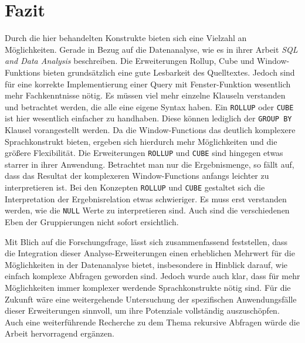 \chapter{Fazit}
\label{chap:fazit} Durch die hier behandelten Konstrukte bieten sich eine Vielzahl
an Möglichkeiten. Gerade in Bezug auf die Datenanalyse, wie es \citet{FOTACHE2015243}
in ihrer Arbeit \textit{SQL and Data Analysis} beschreiben. Die Erweiterungen
Rollup, Cube und Window-Funktions bieten grundsätzlich eine gute Lesbarkeit des Quelltextes.
Jedoch sind für eine korrekte Implementierung einer Query mit Fenster-Funktion
wesentlich mehr Fachkenntnisse nötig. Es müssen viel mehr einzelne Klauseln verstanden
und betrachtet werden, die alle eine eigene Syntax haben. Ein \texttt{ROLLUP}
oder \texttt{CUBE} ist hier wesentlich einfacher zu handhaben. Diese können
lediglich der \texttt{GROUP BY} Klausel vorangestellt werden. Da die Window-Functions
das deutlich komplexere Sprachkonstrukt bieten, ergeben sich hierdurch mehr Möglichkeiten
und die größere Flexibilität. Die Erweiterungen \texttt{ROLLUP} und \texttt{CUBE}
sind hingegen etwas starrer in ihrer Anwendung. Betrachtet man nur die Ergebnismenge,
so fällt auf, dass das Resultat der komplexeren Window-Functions anfangs leichter
zu interpretieren ist. Bei den Konzepten \texttt{ROLLUP} und \texttt{CUBE}
gestaltet sich die Interpretation der Ergebnisrelation etwas schwieriger. Es muss
erst verstanden werden, wie die \texttt{NULL} Werte zu interpretieren sind. Auch
sind die verschiedenen Eben der Gruppierungen nicht sofort ersichtlich.

Mit Blich auf die Forschungsfrage, lässt sich zusammenfassend feststellen, dass
die Integration dieser Analyse-Erweiterungen einen erheblichen Mehrwert für die
Möglichkeiten in der Datenanalyse bietet, insbesondere in Hinblick darauf, wie
einfach komplexe Abfragen geworden sind. Jedoch wurde auch klar, dass für mehr
Möglichkeiten immer komplexer werdende Sprachkonstrukte nötig sind. Für die Zukunft
wäre eine weitergehende Untersuchung der spezifischen Anwendungsfälle dieser Erweiterungen
sinnvoll, um ihre Potenziale vollständig auszuschöpfen. Auch eine weiterführende
Recherche zu dem Thema rekursive Abfragen würde die Arbeit hervorragend ergänzen.